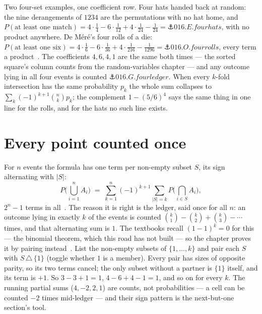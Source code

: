\begin{narrative}
Two four-set examples, one coefficient row. Four hats handed back at
random: the nine derangements of $1234$ are the permutations with no
hat home, and $P(\text{at least one match}) = 4\cdot\tfrac14 -
6\cdot\tfrac1{12} + 4\cdot\tfrac1{24} - \tfrac1{24} =
\anchor{016.E.fourhats}$, with no product anywhere. De Méré's four
rolls of a die: $P(\text{at least one six}) = 4\cdot\tfrac16 -
6\cdot\tfrac1{36} + 4\cdot\tfrac1{216} - \tfrac1{1296} =
\anchor{016.O.fourrolls}$, every term a
product~\cite{probability-eric-w-weisstein-de-m-r-s-problem-mathworld}.
The coefficients $4, 6, 4, 1$ are the same both times — the sorted
square's column counts from the random-variables chapter — and any
outcome lying in all four events is counted $\anchor{016.G.fourledger}$.
When every $k$-fold intersection has the same probability $p_k$ the
whole sum collapses to $\sum_k (-1)^{k+1}\binom{n}{k} p_k$; the
complement $1 - (5/6)^4$ says the same thing in one line for the
rolls, and for the hats no such line exists.

\section{Every point counted once}

For $n$ events the formula has one term per non-empty subset $S$,
its sign alternating with $|S|$:
\[
  P\Big(\bigcup_{i=1}^{n} A_i\Big)
  \;=\; \sum_{k=1}^{n} (-1)^{k+1} \sum_{|S| = k}
        P\Big(\bigcap_{i \in S} A_i\Big) ,
\]
$2^n - 1$ terms in all~\cite{probability-william-feller-an-introduction-to-probability-theory-vol-1-1}.
The reason it is right is the ledger, said once for all $n$: an
outcome lying in exactly $k$ of the events is counted $\binom{k}{1} -
\binom{k}{2} + \binom{k}{3} - \cdots$ times, and that alternating sum
is $1$. The textbooks recall $(1-1)^k = 0$ for this — the binomial
theorem, which this road has not built — so the chapter proves it by
pairing instead~\cite{probability-dennis-white-math-4707-inclusion-exclusion-and-derangements,probability-benjamin-and-quinn-an-alternate-approach-to-alternating-sums}.
List the non-empty subsets of $\{1, \dots, k\}$ and pair each $S$
with $S \,\triangle\, \{1\}$ (toggle whether $1$ is a member). Every
pair has sizes of opposite parity, so its two terms cancel; the only
subset without a partner is $\{1\}$ itself, and its term is $+1$. So
$3 - 3 + 1 = 1$, $4 - 6 + 4 - 1 = 1$, and so on for every $k$. The
running partial sums ($4, -2, 2, 1$) are counts, not probabilities —
a cell can be counted $-2$ times mid-ledger — and their sign pattern
is the next-but-one section's tool.


\end{narrative}
